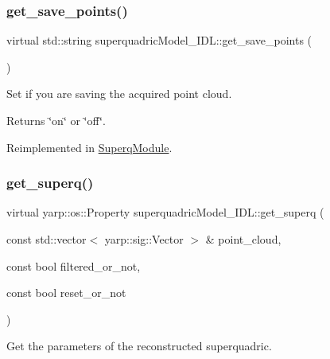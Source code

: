 \subsubsection{\texorpdfstring{get\+\_\+save\+\_\+points()}{get\_save\_points()}}
{\footnotesize\ttfamily virtual std\+::string superquadric\+Model\+\_\+\+I\+D\+L\+::get\+\_\+save\+\_\+points (\begin{DoxyParamCaption}{ }\end{DoxyParamCaption})\hspace{0.3cm}{\ttfamily [virtual]}}



Set if you are saving the acquired point cloud. 

\begin{DoxyReturn}{Returns}
\char`\"{}on\char`\"{} or \char`\"{}off\char`\"{}. 
\end{DoxyReturn}


Reimplemented in \mbox{\hyperlink{classSuperqModule_adfeeea091edd0d32d388b072f4fc9d93}{Superq\+Module}}.

\mbox{\label{classsuperquadricModel__IDL_a10039bb93445066d9dd29d8f6c9ef6c5}} 
\subsubsection{\texorpdfstring{get\+\_\+superq()}{get\_superq()}}
{\footnotesize\ttfamily virtual yarp\+::os\+::\+Property superquadric\+Model\+\_\+\+I\+D\+L\+::get\+\_\+superq (\begin{DoxyParamCaption}\item[{const std\+::vector$<$ yarp\+::sig\+::\+Vector $>$ \&}]{point\+\_\+cloud,  }\item[{const bool}]{filtered\+\_\+or\+\_\+not,  }\item[{const bool}]{reset\+\_\+or\+\_\+not }\end{DoxyParamCaption})\hspace{0.3cm}{\ttfamily [virtual]}}



Get the parameters of the reconstructed superquadric. 


